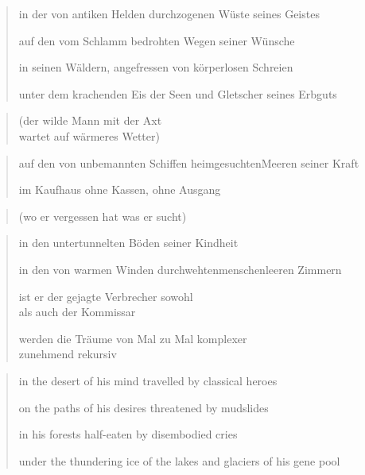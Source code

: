 
{\setlength{\stanzaskip}{0.7em}


\cleartoverso


\begin{verse}
in der von antiken Helden durchzogenen Wüste seines Geistes

auf den vom Schlamm bedrohten Wegen seiner Wünsche

in seinen Wäldern, angefressen von körperlosen Schreien

unter dem krachenden Eis der Seen und Gletscher seines Erbguts
\end{verse}

\begin{quote}
(der wilde Mann mit der Axt\\
wartet auf wärmeres Wetter)
\end{quote}

\begin{verse}
auf den von unbemannten Schiffen heimgesuchten\verselinebreak Meeren seiner Kraft

im Kaufhaus ohne Kassen, ohne Ausgang
\end{verse}

\begin{quote}
(wo er vergessen hat was er sucht)
\end{quote}

\begin{verse}
in den untertunnelten Böden seiner Kindheit

in den von warmen Winden durchwehten\verselinebreak menschenleeren Zimmern

ist er der gejagte Verbrecher sowohl\\
als auch der Kommissar

werden die Träume von Mal zu Mal komplexer\\
zunehmend rekursiv
\end{verse}

\clearpage


\begin{verse}
in the desert of his mind travelled by classical heroes

on the paths of his desires threatened by mudslides

in his forests half-eaten by disembodied cries

under the thundering ice of the lakes and glaciers of his gene pool
\end{verse}

}
